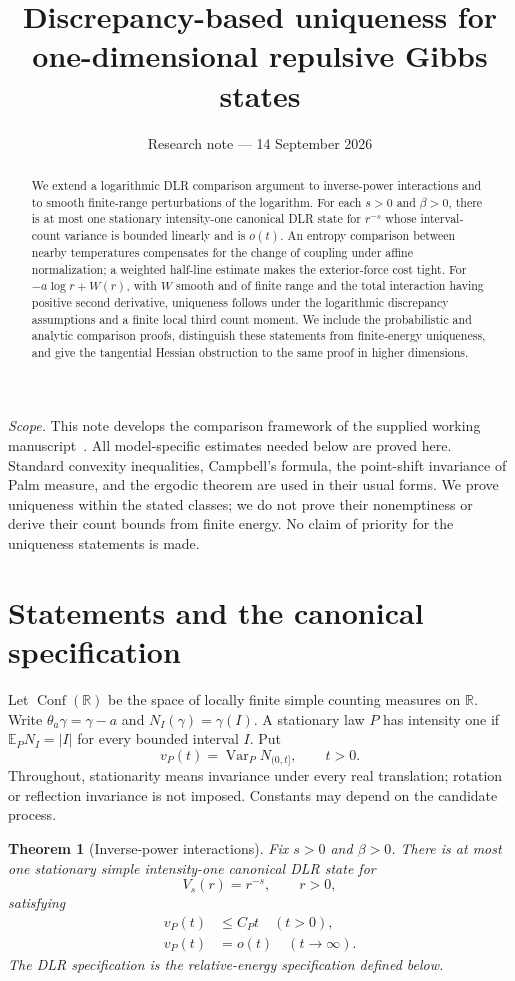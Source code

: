 \documentclass[11pt,reqno]{amsart}
\title[Discrepancy-based DLR uniqueness]{Discrepancy-based uniqueness for\\
one-dimensional repulsive Gibbs states}
\date{Research note --- 14 September 2026}
\numberwithin{equation}{section}
\newtheorem{theorem}{Theorem}[section]
\theoremstyle{definition}
\newcommand{\R}{\mathbb R}
\newcommand{\E}{\mathbb E}
\newcommand{\1}{\mathbf 1}
\DeclareMathOperator{\Var}{Var}
\DeclareMathOperator{\Conf}{Conf}
\begin{document}
\begin{abstract}
We extend a logarithmic DLR comparison argument to inverse-power
interactions and to smooth finite-range perturbations of the logarithm.
For each $s>0$ and $\beta>0$, there is at most one stationary
intensity-one canonical DLR state for $r^{-s}$ whose interval-count
variance is bounded linearly and is $o(t)$. An entropy comparison
between nearby temperatures compensates for the change of coupling
under affine normalization; a weighted half-line estimate makes the
exterior-force cost tight. For $-a\log r+W(r)$, with $W$ smooth and of
finite range and the total interaction having positive second
derivative, uniqueness follows under the logarithmic discrepancy
assumptions and a finite local third count moment. We include the
probabilistic and analytic comparison proofs, distinguish these
statements from finite-energy uniqueness, and give the tangential
Hessian obstruction to the same proof in higher dimensions.
\end{abstract}
\maketitle

\noindent\textit{Scope.}
This note develops the comparison framework of the supplied working
manuscript~\cite{Draft}. All model-specific estimates needed below are
proved here. Standard convexity inequalities, Campbell's formula, the
point-shift invariance of Palm measure, and the ergodic theorem are used
in their usual forms. We prove uniqueness within the stated classes;
we do not prove their nonemptiness or derive their count bounds from
finite energy. No claim of priority for the uniqueness statements is made.

\section{Statements and the canonical specification}
\label{sec:statements}

Let $\Conf(\R)$ be the space of locally finite simple counting measures
on $\R$. Write $\theta_a\gamma=\gamma-a$ and $N_I(\gamma)=\gamma(I)$.
A stationary law $P$ has intensity one if
$\E_PN_I=|I|$ for every bounded interval $I$. Put
\[
v_P(t)=\Var_PN_{(0,t]},\qquad t>0.
\]
Throughout, stationarity means invariance under every real translation;
rotation or reflection invariance is not imposed. Constants may depend
on the candidate process.

\begin{theorem}[Inverse-power interactions]\label{thm:riesz}
Fix $s>0$ and $\beta>0$. There is at most one stationary simple
intensity-one canonical DLR state for
\[
V_s(r)=r^{-s},\qquad r>0,
\]
satisfying
\begin{align}
v_P(t)&\le C_Pt\quad(t>0),\label{hyp:linear}\\
v_P(t)&=o(t)\quad(t\longrightarrow\infty).\label{hyp:sublinear}
\end{align}
The DLR specification is the relative-energy specification defined below.
\end{theorem}
\end{document}
